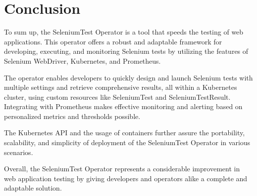 \chapter{Conclusion}
\label{ch:sum}
To sum up, the SeleniumTest Operator is a tool that speeds the testing of web applications. This operator offers a robust and adaptable framework for developing, executing, and monitoring Selenium tests by utilizing the features of Selenium WebDriver, Kubernetes, and Prometheus.

The operator enables developers to quickly design and launch Selenium tests with multiple settings and retrieve comprehensive results, all within a Kubernetes cluster, using custom resources like SeleniumTest and SeleniumTestResult. Integrating with Prometheus makes effective monitoring and alerting based on personalized metrics and thresholds possible.

The Kubernetes API and the usage of containers further assure the portability, scalability, and simplicity of deployment of the SeleniumTest Operator in various scenarios.

Overall, the SeleniumTest Operator represents a considerable improvement in web application testing by giving developers and operators alike a complete and adaptable solution.